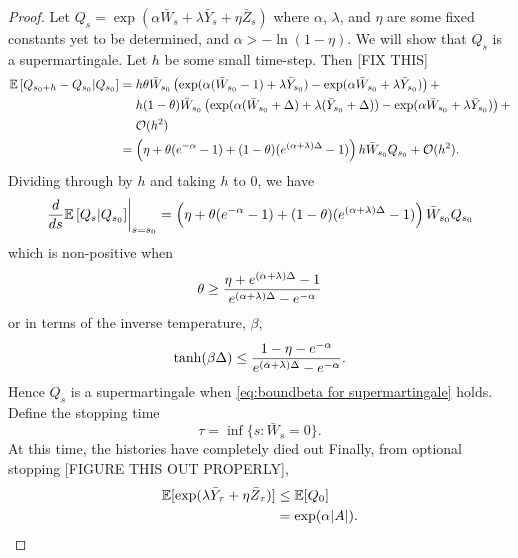 \begin{proof}
		Let $Q_s = \exp \left(\alpha \bar{W}_s + \lambda \bar{Y}_s + \eta \bar{Z}_s\right)$ where $\alpha$, $\lambda$, and $\eta$ are some fixed constants yet to be determined, and $\alpha > -\ln(1 - \eta)$. We will show that $Q_s$ is a supermartingale. Let $h$ be some small time-step. Then [FIX THIS]
		\begin{align}
			\mathbb{E}\left[Q_{s_0 + h} - Q_{s_0}| Q_{s_0}\right] &= h \theta \bar{W}_{s_0} \left(\exp(\alpha (\bar{W}_{s_0} - 1) + \lambda \bar{Y}_{s_0}) - \exp(\alpha \bar{W}_{s_0} + \lambda \bar{Y}_{s_0})\right) + \\
			&\hphantom{= .} h (1 - \theta) \bar{W}_{s_0} \left( \exp(\alpha (\bar{W}_{s_0} + \Delta) + \lambda (\bar{Y}_{s_0} + \Delta)) - \exp(\alpha \bar{W}_{s_0} + \lambda \bar{Y}_{s_0}) \right) + \notag\\
			&\hphantom{= .} \mathcal{O}(h^2) \notag\\
			&= \left(\eta + \theta (e^{-\alpha} - 1) + (1 - \theta)(e^{(\alpha + \lambda)\Delta} - 1)\right)h \bar{W}_{s_0} Q_{s_0} + \mathcal{O}(h^2).
		\end{align}
		Dividing through by $h$ and taking $h$ to $0$, we have
		\begin{equation}
			\label{eq:martingalederivative}
			\left.\frac{d}{ds} \mathbb{E}\left[Q_{s} | Q_{s_0}\right] \right|_{s = s_0} = \left(\eta + \theta (e^{-\alpha} - 1) + (1 - \theta)(e^{(\alpha + \lambda)\Delta} - 1)\right)\bar{W}_{s_0} Q_{s_0}
		\end{equation}
		which is non-positive when
		\begin{equation}
			\theta \geq \frac{\eta + e^{(\alpha + \lambda)\Delta} - 1}{e^{(\alpha + \lambda)\Delta} - e^{-\alpha}}
		\end{equation}
		or in terms of the inverse temperature, $\beta$, 
		\begin{equation}
			\label{eq:boundbeta for supermartingale}
			\tanh(\beta\Delta) \leq \frac{1 - \eta - e^{-\alpha}}{e^{(\alpha+\lambda)\Delta} - e^{-\alpha}}.
		\end{equation}
		Hence $Q_s$ is a supermartingale when \eqref{eq:boundbeta for supermartingale} holds.
		Define the stopping time 
		\begin{equation}
			\tau = \inf\{s: \bar{W}_s = 0\}.
		\end{equation}
		At this time, the histories have completely died out 
		Finally, from optional stopping [FIGURE THIS OUT PROPERLY],
		\begin{align}
			\mathbb{E}[\exp(\lambda \bar{Y}_\tau  + \eta \bar{Z}_\tau)] &\leq \mathbb{E}[Q_{0}]\\
			&= \exp(\alpha |A|).
		\end{align}
	\end{proof}
